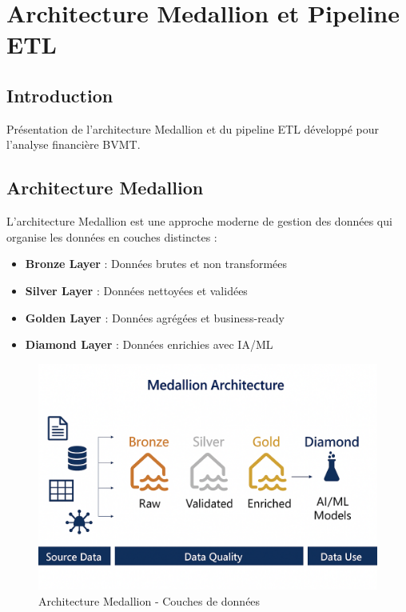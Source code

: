 \section{Architecture Medallion et Pipeline ETL}

\subsection{Introduction}
Présentation de l'architecture Medallion et du pipeline ETL développé pour l'analyse financière BVMT.

\subsection{Architecture Medallion}
L'architecture Medallion est une approche moderne de gestion des données qui organise les données en couches distinctes :
\begin{itemize}
    \item \textbf{Bronze Layer} : Données brutes et non transformées
    \item \textbf{Silver Layer} : Données nettoyées et validées
    \item \textbf{Golden Layer} : Données agrégées et business-ready
    \item \textbf{Diamond Layer} : Données enrichies avec IA/ML
\end{itemize}



\begin{figure}[H]
    \centering
    \includegraphics[width=\figwidth]{img/ChatGPT Image Sep 1, 2025, 10_13_07 AM.png}
    \caption{Architecture Medallion - Couches de données}
    \label{fig:medallion_architecture}
\end{figure}

